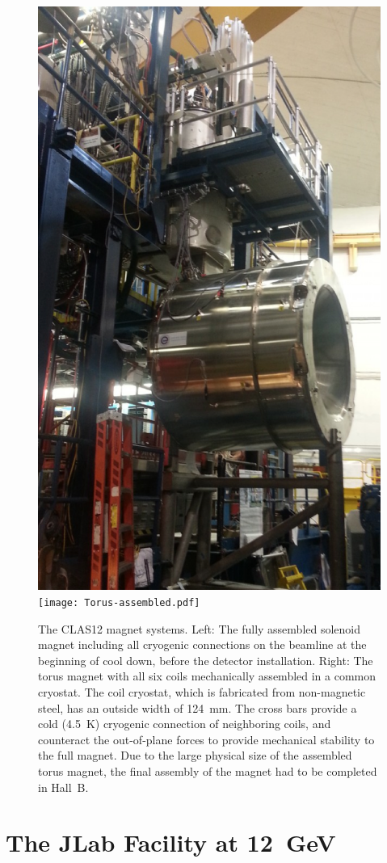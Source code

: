 \documentclass[final,3p]{elsarticle}
\begin{document}
\begin{twocolumn}
\begin{figure}[th!]
\centerline{\includegraphics[width=0.65\columnwidth]{solenoid-magnet.png}
\texttt{[image: Torus-assembled.pdf]}}
\caption{The CLAS12 magnet systems. Left: The fully assembled solenoid magnet including all cryogenic connections on
  the beamline at the beginning of cool down, before the detector installation. Right: The torus magnet with all six coils
  mechanically assembled in a common cryostat. The coil cryostat, which is fabricated from non-magnetic steel, has an
  outside width of 124~mm. The cross bars provide a cold (4.5~K) cryogenic connection of neighboring coils, and
  counteract the out-of-plane forces to provide mechanical stability to the full magnet. Due to the large physical size of
  the assembled torus magnet, the final assembly of the magnet had to be completed in Hall~B.}
\label{clas12-magnets}
\end{figure}

\section{The JLab Facility at 12~GeV}
\label{jlab}


\end{twocolumn}
\end{document}
